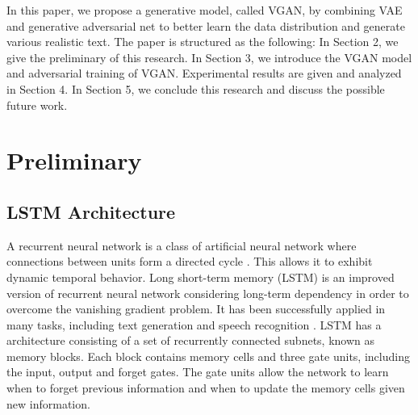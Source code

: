 \documentclass{llncs}
\begin{document}
In this paper, we propose a generative model, called VGAN, by combining VAE and generative adversarial net to better learn the data distribution and generate various realistic text. The paper is structured as the following: In Section 2, we give the preliminary of this research. In Section 3, we introduce the VGAN model and adversarial training of VGAN. Experimental results are given and analyzed in Section 4. In Section 5, we conclude this research and discuss the possible future work.





\section{Preliminary}
\subsection{LSTM Architecture}
A recurrent neural network is a class of artificial neural network where connections between units form a directed cycle \cite{mikolov2010recurrent}. This allows it to exhibit dynamic temporal behavior. Long short-term memory (LSTM) is an improved version of recurrent neural network considering long-term dependency in order to overcome the vanishing gradient problem. It has been successfully applied  in many tasks, including text generation and speech recognition \cite{Hochreiter1997Long}. LSTM has a architecture consisting of a set of recurrently connected subnets, known as memory blocks. Each block contains memory cells and three gate units, including the input, output and forget gates. The gate units allow the network to learn when to forget previous information and when to update the memory cells given new information.
\end{document}
